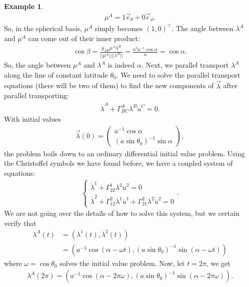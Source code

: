 \documentclass{article}
\theoremstyle{definition}
\newtheorem{exmp}{Example}[section]
\begin{document}
\begin{exmp}
\begin{align*}
	\mu^A = 1 \vec{e}_{\theta} + 0\vec{e}_\phi.
	\end{align*} 
	So, in the spherical basis, $\mu^A$ simply becomes $(1,0)^\top$. The angle between $\lambda^A$ and $\mu^A$ can come out of their inner product:
	\begin{align*}
	\cos\beta = \frac{g_{AB}\mu^A\lambda^B}{\vert\vert \mu^A \vert\vert \vert\vert \lambda^B\vert\vert} = \frac{a^2a^{-1}\cos\alpha}{a} = \cos\alpha.
	\end{align*}
	So, the angle between $\mu^A$ and $\lambda^A$ is indeed $\alpha$. Next, we parallel transport $\lambda^A$ along the line of constant latitude $\theta_0$. We need to solve the parallel transport equations (there will be two of them) to find the new components of $\vec{\lambda}$ after parallel transporting:
	\begin{align*}
	\dot{\lambda}^A + \Gamma^A_{BC}\lambda^B\dot{u}^C = 0.
	\end{align*}
	With initial values
	\begin{align*}
	\vec{\lambda}(0) = 
	\begin{pmatrix}
	a^{-1}\cos\alpha\\
	\left(a\sin\theta_0 \right)^{-1}\sin\alpha 
	\end{pmatrix},
	\end{align*}
	the problem boils down to an ordinary differential initial value problem. Using the Christoffel symbols we have found before, we have a coupled system of equations:
	\begin{align*}
	\begin{cases*}
	\dot{\lambda}^1 + \Gamma^1_{22}\lambda^2 \dot{u}^2 = 0\\
	\dot{\lambda}^2 + \Gamma^2_{12}\lambda^1\dot{u}^1 + \Gamma^2_{21}\lambda^2\dot{u}^2= 0
	\end{cases*}.
	\end{align*}
	We are not going over the details of how to solve this system, but we certain verify that 
	\begin{align*}
	\lambda^A(t) &= \left( \lambda^1(t),\lambda^2(t)\right)\\
	&= \left(a^{-1}\cos(\alpha-\omega t), \left( a\sin\theta_0\right)^{-1}\sin(\alpha-\omega t)  \right)  
	\end{align*}
	where $\omega = \cos\theta_0$ solves the initial value problem. Now, let $t = 2\pi$, we get
	\begin{align*}
	\lambda^A(2\pi) = \left(a^{-1}\cos(\alpha - 2\pi\omega) , \left(a\sin\theta_0 \right)^{-1}\sin(\alpha-2\pi\omega)  \right). 
	\end{align*}

\end{exmp}
\end{document}
